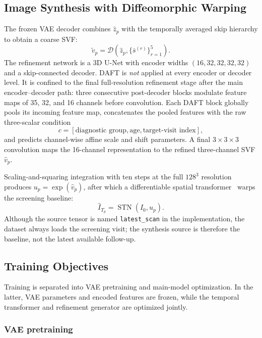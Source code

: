 \subsection{Image Synthesis with Diffeomorphic Warping}

The frozen VAE decoder combines $\hat z_p$ with the temporally averaged skip hierarchy to obtain a coarse SVF:
\begin{equation}
    \tilde v_p=\mathcal{D}(\hat z_p,\{\bar s^{(r)}\}_{r=1}^{5}).
\end{equation}
The refinement network is a 3D U-Net with encoder widths $(16,32,32,32,32)$ and a skip-connected decoder. DAFT is \emph{not} applied at every encoder or decoder level. It is confined to the final full-resolution refinement stage after the main encoder--decoder path: three consecutive post-decoder blocks modulate feature maps of 35, 32, and 16 channels before convolution. Each DAFT block globally pools its incoming feature map, concatenates the pooled features with the raw three-scalar condition
\begin{equation}
    c=[\text{diagnostic group},\text{age},\text{target-visit index}],
\end{equation}
and predicts channel-wise affine scale and shift parameters. A final $3\times3\times3$ convolution maps the 16-channel representation to the refined three-channel SVF $\hat v_p$.

Scaling-and-squaring integration with ten steps at the full $128^3$ resolution produces $u_p=\exp(\hat v_p)$, after which a differentiable spatial transformer~\cite{jaderberg2015spatial} warps the screening baseline:
\begin{equation}
    \hat I_{T_p}=\operatorname{STN}(I_0,u_p).
\end{equation}
Although the source tensor is named \texttt{latest\_scan} in the implementation, the dataset always loads the screening visit; the synthesis source is therefore the baseline, not the latest available follow-up.

\subsection{Training Objectives}
\label{sec:training_objectives}

Training is separated into VAE pretraining and main-model optimization. In the latter, VAE parameters and encoded features are frozen, while the temporal transformer and refinement generator are optimized jointly.

\subsubsection*{VAE pretraining}

